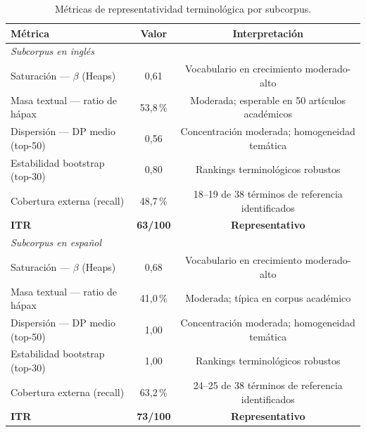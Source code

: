 \begin{table}[H]
\centering
\fontsize{10}{12}\selectfont
\begin{tabular}{lcc}
\toprule
\textbf{Métrica} & \textbf{Valor} & \textbf{Interpretación} \\
\midrule
\multicolumn{3}{l}{\textit{Subcorpus en inglés}} \\
\hspace{1em}Saturación — $\beta$ (Heaps) & 0,61
    & Vocabulario en crecimiento moderado-alto \\
\hspace{1em}Masa textual — ratio de hápax & 53,8\,\%
    & Moderada; esperable en 50 artículos académicos \\
\hspace{1em}Dispersión — DP medio (top-50) & 0,56
    & Concentración moderada; homogeneidad temática \\
\hspace{1em}Estabilidad bootstrap (top-30) & 0,80
    & Rankings terminológicos robustos \\
\hspace{1em}Cobertura externa (recall) & 48,7\,\%
    & 18--19 de 38 términos de referencia identificados \\
\rowcolor{gray!20}\hspace{1em}\textbf{ITR} & \textbf{63/100}
    & \textbf{Representativo} \\
\midrule
\multicolumn{3}{l}{\textit{Subcorpus en español}} \\
\hspace{1em}Saturación — $\beta$ (Heaps) & 0,68 & Vocabulario en crecimiento moderado-alto \\
\hspace{1em}Masa textual — ratio de hápax & 41,0\,\% & Moderada; típica en corpus académico \\
\hspace{1em}Dispersión — DP medio (top-50) & 1,00 & Concentración moderada; homogeneidad temática \\
\hspace{1em}Estabilidad bootstrap (top-30) & 1,00 & Rankings terminológicos robustos \\
\hspace{1em}Cobertura externa (recall) & 63,2\,\% & 24--25 de 38 términos de referencia identificados \\
\rowcolor{gray!20}\hspace{1em}\textbf{ITR} & \textbf{73/100} & \textbf{Representativo} \\
\bottomrule
\end{tabular}
\caption{Métricas de representatividad terminológica por subcorpus.}
\label{tab:itr_summary}
\end{table}

